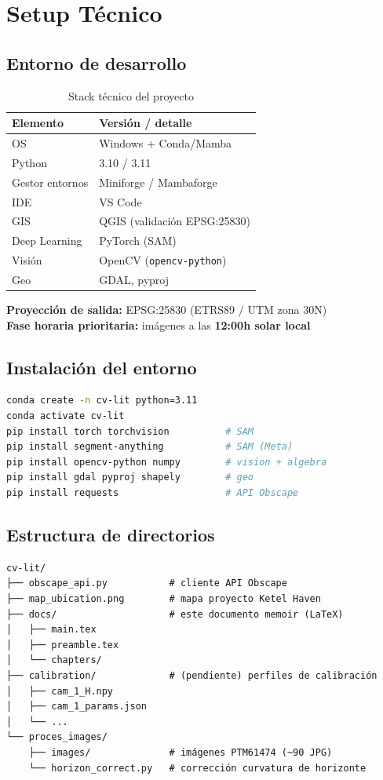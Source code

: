 \chapter{Setup Técnico}

\section{Entorno de desarrollo}

\begin{table}[h!]
\centering
\begin{tabular}{ll}
\toprule
\textbf{Elemento} & \textbf{Versión / detalle} \\
\midrule
OS              & Windows + Conda/Mamba \\
Python          & 3.10 / 3.11 \\
Gestor entornos & Miniforge / Mambaforge \\
IDE             & VS Code \\
GIS             & QGIS (validación EPSG:25830) \\
Deep Learning   & PyTorch (SAM) \\
Visión          & OpenCV (\texttt{opencv-python}) \\
Geo             & GDAL, pyproj \\
\bottomrule
\end{tabular}
\caption{Stack técnico del proyecto}
\end{table}

\textbf{Proyección de salida:} EPSG:25830 (ETRS89 / UTM zona 30N)\\
\textbf{Fase horaria prioritaria:} imágenes a las \textbf{12:00h solar local}

\section{Instalación del entorno}

\begin{lstlisting}[language=bash]
conda create -n cv-lit python=3.11
conda activate cv-lit
pip install torch torchvision          # SAM
pip install segment-anything           # SAM (Meta)
pip install opencv-python numpy        # vision + algebra
pip install gdal pyproj shapely        # geo
pip install requests                   # API Obscape
\end{lstlisting}

\section{Estructura de directorios}

\begin{Verbatim}
cv-lit/
├── obscape_api.py           # cliente API Obscape
├── map_ubication.png        # mapa proyecto Ketel Haven
├── docs/                    # este documento memoir (LaTeX)
│   ├── main.tex
│   ├── preamble.tex
│   └── chapters/
├── calibration/             # (pendiente) perfiles de calibración
│   ├── cam_1_H.npy
│   ├── cam_1_params.json
│   └── ...
└── proces_images/
    ├── images/              # imágenes PTM61474 (~90 JPG)
    └── horizon_correct.py   # corrección curvatura de horizonte
\end{Verbatim}

